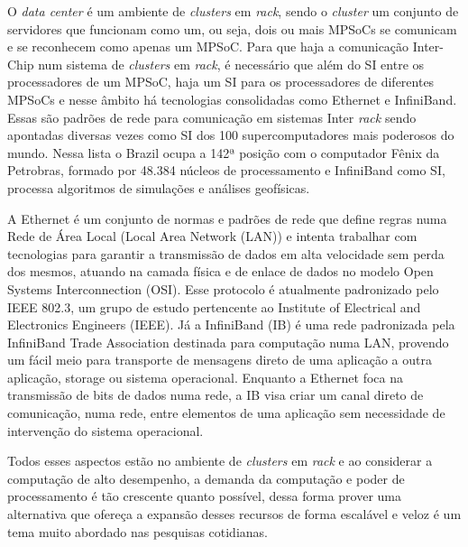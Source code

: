 \documentclass[a4paper,12pt]{article}
\begin{document}
O \textit{data center} é um ambiente de \textit{clusters} em \textit{rack}, sendo o \textit{cluster} um conjunto de servidores que funcionam como um, ou seja, dois ou mais MPSoCs se comunicam e se reconhecem como apenas um MPSoC. Para que haja a comunicação Inter-Chip num sistema de \textit{clusters} em \textit{rack}, é necessário que além do SI entre os processadores de um MPSoC, haja um SI para os processadores de diferentes MPSoCs e nesse âmbito há tecnologias consolidadas como Ethernet e InfiniBand. Essas são padrões de rede para comunicação em sistemas Inter \textit{rack} sendo apontadas diversas vezes como SI dos 100 supercomputadores mais poderosos do mundo. Nessa lista o Brazil ocupa a 142ª posição com o computador Fênix da Petrobras, formado por 48.384 núcleos de processamento e InfiniBand como SI, processa algoritmos de simulações e análises geofísicas.

A Ethernet é um conjunto de normas e padrões de rede que define regras numa Rede de Área Local (Local Area Network (LAN)) e intenta trabalhar com tecnologias para garantir a transmissão de dados em alta velocidade sem perda dos mesmos, atuando na camada física e de enlace de dados no modelo Open Systems Interconnection (OSI). Esse protocolo é atualmente padronizado pelo IEEE 802.3, um grupo de estudo pertencente ao Institute of Electrical and Electronics Engineers (IEEE). Já a InfiniBand (IB) é uma rede padronizada pela InfiniBand Trade Association destinada para computação numa LAN, provendo um fácil meio para transporte de mensagens direto de uma aplicação a outra aplicação, storage ou sistema operacional. Enquanto a Ethernet foca na transmissão de bits de dados numa rede, a IB visa criar um canal direto de comunicação, numa rede, entre elementos de uma aplicação sem necessidade de intervenção do sistema operacional.

Todos esses aspectos estão no ambiente de \textit{clusters} em \textit{rack} e ao considerar a computação de alto desempenho, a demanda da computação e poder de processamento é tão crescente quanto possível, dessa forma prover uma alternativa que ofereça a expansão desses recursos de forma escalável e veloz é um tema muito abordado nas pesquisas cotidianas.

\end{document}
